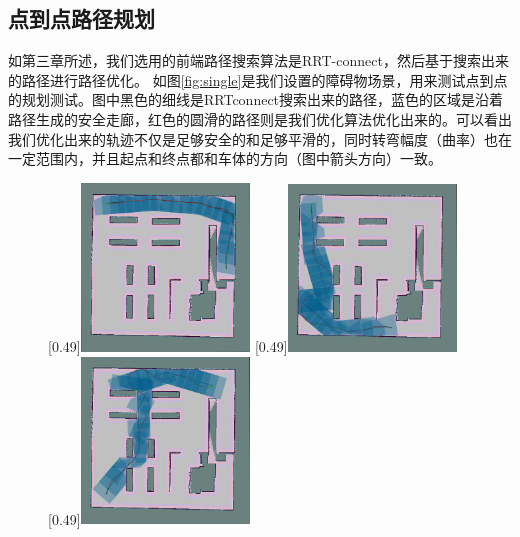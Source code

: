 \documentclass[master,academic]{ysuthesis} %
\begin{document}
		\subsection{点到点路径规划}
		如第三章所述，我们选用的前端路径搜索算法是RRT-connect，然后基于搜索出来的路径进行路径优化。
		如图\ref{fig:single}是我们设置的障碍物场景，用来测试点到点的规划测试。图中黑色的细线是RRTconnect搜索出来的路径，蓝色的区域是沿着路径生成的安全走廊，红色的圆滑的路径则是我们优化算法优化出来的。可以看出我们优化出来的轨迹不仅是足够安全的和足够平滑的，同时转弯幅度（曲率）也在一定范围内，并且起点和终点都和车体的方向（图中箭头方向）一致。
		\begin{figure}[!ht]
			\centering
			[0.49\textwidth]{\includegraphics[width=0.4\textwidth]{single_1.png}}
			[0.49\textwidth]{\includegraphics[width=0.4\textwidth]{single_2.png}}
			[0.49\textwidth]{\includegraphics[width=0.4\textwidth]{single_3.png}}

\end{figure}
\end{document}
